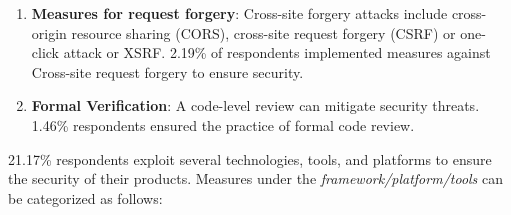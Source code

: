 \begin{enumerate}[label=(\alph*)]
    \item \textbf{Measures for request forgery}: Cross-site forgery attacks include cross-origin resource sharing (CORS), cross-site request forgery (CSRF) or one-click attack or XSRF. 2.19\% of respondents implemented measures against  Cross-site request forgery to ensure security.
    
    \item \textbf{Formal Verification}: A code-level review can mitigate security threats. 1.46\% respondents ensured the practice of formal code review.
    
\end{enumerate}

21.17\% respondents exploit several technologies, tools, and platforms to ensure the security of their products. Measures under the \emph{framework/platform/tools} can be categorized as follows:

